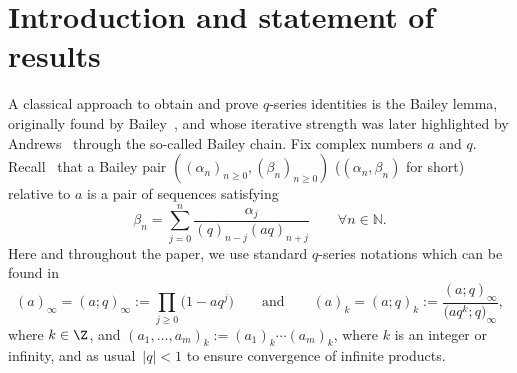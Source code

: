 \section{Introduction and statement of results}\label{sec:intro}

A classical approach to obtain and prove $q$-series identities is the Bailey lemma, originally found by Bailey~\cite{Ba}, and whose iterative strength was later highlighted by Andrews~\cite{A1, A2, AAR} through the so-called Bailey chain.
Fix complex numbers $a$ and $q$. Recall~\cite{Ba} that a Bailey pair $((\alpha_n)_{n\geq0}, (\beta_n)_{n\geq0})$ ($(\alpha_n, \beta_n)$ for short) relative to $a$ is a pair of sequences satisfying
\begin{equation}\label{bp}
\beta_n=\sum_{j=0}^n\frac{\alpha_j}{(q)_{n-j}(aq)_{n+j}}\qquad\forall n\in\mathbb{N}.
\end{equation}
Here and throughout the paper, we use standard $q$-series notations which can be found in~\cite{GR}
\begin{equation*}
(a)_\infty = (a;q)_\infty:=\prod_{j\geq 0}\bigl(1-aq^j\bigr)\qquad\mbox{and}\qquad(a)_k = (a;q)_k:=\frac{(a;q)_\infty}{\bigl(aq^k;q\bigr)_\infty},
\end{equation*}
where $k \in \Z$, and
$
(a_1,\ldots,a_m)_k:=(a_1)_k\cdots(a_m)_k$,
where $k$ is an integer or infinity, and as usual~${|q|<1}$ to ensure convergence of infinite products.
